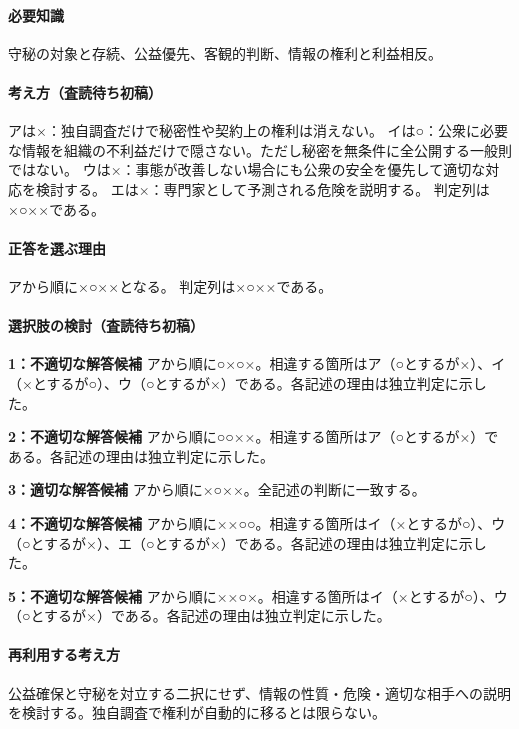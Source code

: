 \paragraph{必要知識} 守秘の対象と存続、公益優先、客観的判断、情報の権利と利益相反。

\paragraph{考え方（査読待ち初稿）} アは×：独自調査だけで秘密性や契約上の権利は消えない。 イは○：公衆に必要な情報を組織の不利益だけで隠さない。ただし秘密を無条件に全公開する一般則ではない。 ウは×：事態が改善しない場合にも公衆の安全を優先して適切な対応を検討する。 エは×：専門家として予測される危険を説明する。 判定列は×○××である。

\paragraph{正答を選ぶ理由} アから順に×○××となる。  判定列は×○××である。

\paragraph{選択肢の検討（査読待ち初稿）}\mbox{}\par

\noindent\textbf{1：不適切な解答候補} アから順に○×○×。相違する箇所はア（○とするが×）、イ（×とするが○）、ウ（○とするが×）である。各記述の理由は独立判定に示した。\par

\noindent\textbf{2：不適切な解答候補} アから順に○○××。相違する箇所はア（○とするが×）である。各記述の理由は独立判定に示した。\par

\noindent\textbf{3：適切な解答候補} アから順に×○××。全記述の判断に一致する。\par

\noindent\textbf{4：不適切な解答候補} アから順に××○○。相違する箇所はイ（×とするが○）、ウ（○とするが×）、エ（○とするが×）である。各記述の理由は独立判定に示した。\par

\noindent\textbf{5：不適切な解答候補} アから順に××○×。相違する箇所はイ（×とするが○）、ウ（○とするが×）である。各記述の理由は独立判定に示した。\par

\paragraph{再利用する考え方} 公益確保と守秘を対立する二択にせず、情報の性質・危険・適切な相手への説明を検討する。独自調査で権利が自動的に移るとは限らない。

